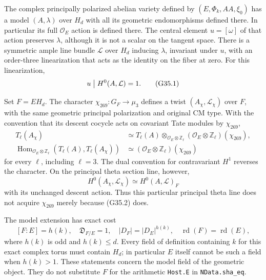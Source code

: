 \begin{theorem}
\label{AC-G35}
The complex principally polarized abelian variety defined by
$(E,\Phi_k,AA,\xi_0)$ has a model $(A,\lambda)$ over $H_d$
with all its geometric endomorphisms defined there.
In particular its full $\mathcal O_E$ action is defined there.
The central element $u=[\omega]$ of that action preserves
$\lambda$, although it is not a scalar on the tangent space.
There is a symmetric ample line bundle $\mathcal L$ over $H_d$
inducing $\lambda$, invariant under $u$, with an order-three
linearization that acts as the identity on the fiber at zero.
For this linearization,
\[
             u\bigm|H^0(A,\mathcal L)=1.               \tag{G35.1}
\]

Set $F=EH_d$.  The character $\chi_{269}:G_F\to\mu_3$
defines a twist $(A_\chi,\mathcal L_\chi)$ over $F$,
with the same geometric principal polarization and original
CM type.  With the convention that its descent cocycle acts
on covariant Tate modules by $\chi_{269}$,
\[
 \begin{split}
 T_\ell(A_\chi)&\simeq
      T_\ell(A)\otimes_{\mathcal O_E\otimes\mathbb Z_\ell}
            (\mathcal O_E\otimes\mathbb Z_\ell)(\chi_{269}),\\
 \operatorname{Hom}_{\mathcal O_E\otimes\mathbb Z_\ell}
       (T_\ell(A),T_\ell(A_\chi))
      &\simeq(\mathcal O_E\otimes\mathbb Z_\ell)(\chi_{269})
 \end{split}
                                                        \tag{G35.2}
\]
for every $\ell$, including $\ell=3$.
The dual convention for contravariant $H^1$ reverses the
character.  On the principal theta section line, however,
\[
             H^0(A_\chi,\mathcal L_\chi)
                   \simeq H^0(A,\mathcal L)_F           \tag{G35.3}
\]
with its unchanged descent action.
Thus this particular principal theta line does not acquire
$\chi_{269}$ merely because (G35.2) does.

The model extension has exact cost
\[
 [F:E]=h(k),\quad \mathfrak D_{F/E}=1,\quad
       |D_F|=|D_E|^{h(k)},\quad\operatorname{rd}(F)=\operatorname{rd}(E),
                                                        \tag{G35.4}
\]
where $h(k)$ is odd and $h(k)\le d$.
Every field of definition containing $k$ for this exact
complex torus must contain $H_d$; in particular $E$ itself
cannot be such a field when $h(k)>1$.
These statements concern the model field of the geometric
object.  They do not substitute $F$ for the arithmetic
\texttt{Host.E} in \texttt{NData.sha\_eq}.
\end{theorem}
